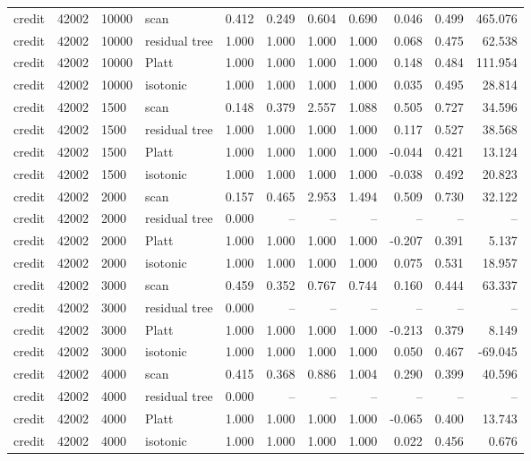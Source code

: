 \begin{tabular}{lrllrrrrrrr}
credit & 42002 & 10000 & scan & 0.412 & 0.249 & 0.604 & 0.690 & 0.046 & 0.499 & 465.076 \\
credit & 42002 & 10000 & residual tree & 1.000 & 1.000 & 1.000 & 1.000 & 0.068 & 0.475 & 62.538 \\
credit & 42002 & 10000 & Platt & 1.000 & 1.000 & 1.000 & 1.000 & 0.148 & 0.484 & 111.954 \\
credit & 42002 & 10000 & isotonic & 1.000 & 1.000 & 1.000 & 1.000 & 0.035 & 0.495 & 28.814 \\
credit & 42002 & 1500 & scan & 0.148 & 0.379 & 2.557 & 1.088 & 0.505 & 0.727 & 34.596 \\
credit & 42002 & 1500 & residual tree & 1.000 & 1.000 & 1.000 & 1.000 & 0.117 & 0.527 & 38.568 \\
credit & 42002 & 1500 & Platt & 1.000 & 1.000 & 1.000 & 1.000 & -0.044 & 0.421 & 13.124 \\
credit & 42002 & 1500 & isotonic & 1.000 & 1.000 & 1.000 & 1.000 & -0.038 & 0.492 & 20.823 \\
credit & 42002 & 2000 & scan & 0.157 & 0.465 & 2.953 & 1.494 & 0.509 & 0.730 & 32.122 \\
credit & 42002 & 2000 & residual tree & 0.000 & -- & -- & -- & -- & -- & -- \\
credit & 42002 & 2000 & Platt & 1.000 & 1.000 & 1.000 & 1.000 & -0.207 & 0.391 & 5.137 \\
credit & 42002 & 2000 & isotonic & 1.000 & 1.000 & 1.000 & 1.000 & 0.075 & 0.531 & 18.957 \\
credit & 42002 & 3000 & scan & 0.459 & 0.352 & 0.767 & 0.744 & 0.160 & 0.444 & 63.337 \\
credit & 42002 & 3000 & residual tree & 0.000 & -- & -- & -- & -- & -- & -- \\
credit & 42002 & 3000 & Platt & 1.000 & 1.000 & 1.000 & 1.000 & -0.213 & 0.379 & 8.149 \\
credit & 42002 & 3000 & isotonic & 1.000 & 1.000 & 1.000 & 1.000 & 0.050 & 0.467 & -69.045 \\
credit & 42002 & 4000 & scan & 0.415 & 0.368 & 0.886 & 1.004 & 0.290 & 0.399 & 40.596 \\
credit & 42002 & 4000 & residual tree & 0.000 & -- & -- & -- & -- & -- & -- \\
credit & 42002 & 4000 & Platt & 1.000 & 1.000 & 1.000 & 1.000 & -0.065 & 0.400 & 13.743 \\
credit & 42002 & 4000 & isotonic & 1.000 & 1.000 & 1.000 & 1.000 & 0.022 & 0.456 & 0.676 \\

\end{tabular}
